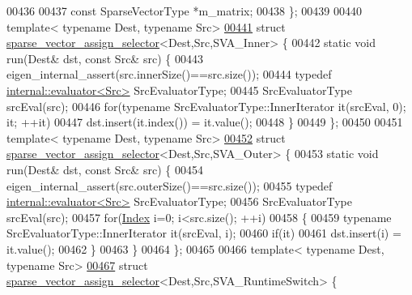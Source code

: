 \begin{DoxyCode}
00436   
00437   \textcolor{keyword}{const} SparseVectorType *m\_matrix;
00438 \};
00439 
00440 \textcolor{keyword}{template}< \textcolor{keyword}{typename} Dest, \textcolor{keyword}{typename} Src>
\hyperlink{struct_eigen_1_1internal_1_1sparse__vector__assign__selector_3_01_dest_00_01_src_00_01_s_v_a___inner_01_4}{00441} \textcolor{keyword}{struct }\hyperlink{struct_eigen_1_1internal_1_1sparse__vector__assign__selector}{sparse\_vector\_assign\_selector}<Dest,Src,SVA\_Inner> \{
00442   \textcolor{keyword}{static} \textcolor{keywordtype}{void} run(Dest& dst, \textcolor{keyword}{const} Src& src) \{
00443     eigen\_internal\_assert(src.innerSize()==src.size());
00444     \textcolor{keyword}{typedef} \hyperlink{struct_eigen_1_1internal_1_1evaluator}{internal::evaluator<Src>} SrcEvaluatorType;
00445     SrcEvaluatorType srcEval(src);
00446     \textcolor{keywordflow}{for}(\textcolor{keyword}{typename} SrcEvaluatorType::InnerIterator it(srcEval, 0); it; ++it)
00447       dst.insert(it.index()) = it.value();
00448   \}
00449 \};
00450 
00451 \textcolor{keyword}{template}< \textcolor{keyword}{typename} Dest, \textcolor{keyword}{typename} Src>
\hyperlink{struct_eigen_1_1internal_1_1sparse__vector__assign__selector_3_01_dest_00_01_src_00_01_s_v_a___outer_01_4}{00452} \textcolor{keyword}{struct }\hyperlink{struct_eigen_1_1internal_1_1sparse__vector__assign__selector}{sparse\_vector\_assign\_selector}<Dest,Src,SVA\_Outer> \{
00453   \textcolor{keyword}{static} \textcolor{keywordtype}{void} run(Dest& dst, \textcolor{keyword}{const} Src& src) \{
00454     eigen\_internal\_assert(src.outerSize()==src.size());
00455     \textcolor{keyword}{typedef} \hyperlink{struct_eigen_1_1internal_1_1evaluator}{internal::evaluator<Src>} SrcEvaluatorType;
00456     SrcEvaluatorType srcEval(src);
00457     \textcolor{keywordflow}{for}(\hyperlink{namespace_eigen_a62e77e0933482dafde8fe197d9a2cfde}{Index} i=0; i<src.size(); ++i)
00458     \{
00459       \textcolor{keyword}{typename} SrcEvaluatorType::InnerIterator it(srcEval, i);
00460       \textcolor{keywordflow}{if}(it)
00461         dst.insert(i) = it.value();
00462     \}
00463   \}
00464 \};
00465 
00466 \textcolor{keyword}{template}< \textcolor{keyword}{typename} Dest, \textcolor{keyword}{typename} Src>
\hyperlink{struct_eigen_1_1internal_1_1sparse__vector__assign__selector_3_01_dest_00_01_src_00_01_s_v_a___runtime_switch_01_4}{00467} \textcolor{keyword}{struct }\hyperlink{struct_eigen_1_1internal_1_1sparse__vector__assign__selector}{sparse\_vector\_assign\_selector}<Dest,Src,SVA\_RuntimeSwitch> \{

\end{DoxyCode}
